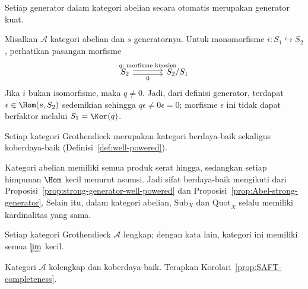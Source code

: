\begin{proposisi}\label{prop:Abel-strong-generator}
Setiap generator dalam kategori abelian secara otomatis merupakan generator
kuat.
\end{proposisi}
\begin{bukti}
Misalkan $\mathcal{A}$ kategori abelian dan $s$ generatornya. Untuk
monomorfisme $i:S_1\hookrightarrow S_2$, perhatikan pasangan morfisme
\[\begin{tikzcd}[column sep=large]
	S_2\arrow[shift left,r,"q:\text{ morfisme kuosien}"]
	\arrow[shift right,r,"0"']&S_2/S_1
\end{tikzcd}\]
Jika $i$ bukan isomorfisme, maka $q\neq0$. Jadi, dari definisi generator,
terdapat $\epsilon\in\Hom(s,S_2)$ sedemikian sehingga
$q\epsilon\neq0\epsilon=0$; morfisme $\epsilon$ ini tidak dapat berfaktor
melalui $S_1=\Ker(q)$.
\end{bukti}

\begin{korolari}\label{prop:Grothendieck-cat-wellpowered}
Setiap kategori Grothendieck merupakan kategori berdaya-baik sekaligus
koberdaya-baik (Definisi~\ref{def:well-powered}).
\end{korolari}
\begin{bukti}
Kategori abelian memiliki semua produk serat hingga, sedangkan setiap
himpunan $\Hom$ kecil menurut asumsi. Jadi sifat berdaya-baik mengikuti dari
Proposisi~\ref{prop:strong-generator-well-powered} dan
Proposisi~\ref{prop:Abel-strong-generator}. Selain itu, dalam kategori abelian,
$\mathrm{Sub}_X$ dan $\mathrm{Quot}_X$ selalu memiliki kardinalitas yang sama.
\end{bukti}

\begin{korolari}\label{prop:Grothendieck-cat-complete}
Setiap kategori Grothendieck $\mathcal{A}$ lengkap; dengan kata lain, kategori
ini memiliki semua $\varprojlim$ kecil.
\end{korolari}
\begin{bukti}
Kategori $\mathcal{A}$ kolengkap dan koberdaya-baik. Terapkan
Korolari~\ref{prop:SAFT-completeness}.
\end{bukti}

